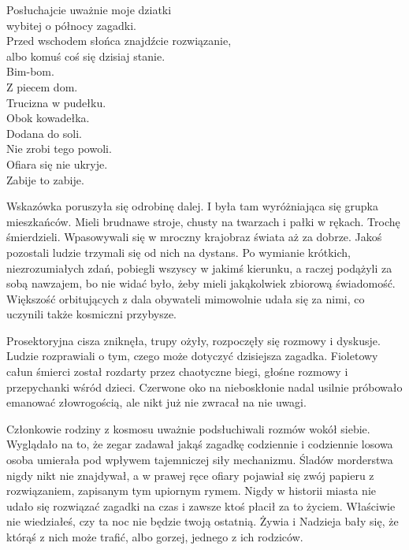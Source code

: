 \begin{poem}
	Posłuchajcie uważnie moje dziatki \\
	wybitej o północy zagadki. \\
	Przed wschodem słońca znajdźcie rozwiązanie, \\
	albo komuś coś się dzisiaj stanie. \\
	Bim-bom. \\
	Z piecem dom. \\
	Trucizna w pudełku. \\
	Obok kowadełka. \\
	Dodana do soli. \\
	Nie zrobi tego powoli. \\
	Ofiara się nie ukryje. \\
	Zabije to zabije. \\
\end{poem}

Wskazówka poruszyła się odrobinę dalej.
I była tam wyróżniająca się grupka mieszkańców.
Mieli brudnawe stroje, chusty na twarzach i pałki w rękach. Trochę śmierdzieli.
Wpasowywali się w mroczny krajobraz świata aż za dobrze.
Jakoś pozostali ludzie trzymali się od nich na dystans.
Po wymianie krótkich, niezrozumiałych zdań, pobiegli wszyscy w jakimś kierunku, a raczej podążyli za sobą nawzajem, bo nie widać było, żeby mieli jakąkolwiek zbiorową świadomość.
Większość orbitujących z dala obywateli mimowolnie udała się za nimi, co uczynili także kosmiczni przybysze.

Prosektoryjna cisza zniknęła, trupy ożyły, rozpoczęły się rozmowy i dyskusje.
Ludzie rozprawiali o tym, czego może dotyczyć dzisiejsza zagadka.
Fioletowy całun śmierci został rozdarty przez chaotyczne biegi, głośne rozmowy i przepychanki wśród dzieci.
Czerwone oko na nieboskłonie nadal usilnie próbowało emanować złowrogością, ale nikt już nie zwracał na nie uwagi.

Członkowie rodziny z kosmosu uważnie podsłuchiwali rozmów wokół siebie.
Wyglądało na to, że zegar zadawał jakąś zagadkę codziennie i codziennie losowa osoba umierała pod wpływem tajemniczej siły mechanizmu.
Śladów morderstwa nigdy nikt nie znajdywał, a w prawej ręce ofiary pojawiał się zwój papieru z rozwiązaniem, zapisanym tym upiornym rymem.
Nigdy w historii miasta nie udało się rozwiązać zagadki na czas i zawsze ktoś płacił za to życiem.
Właściwie nie wiedziałeś, czy ta noc nie będzie twoją ostatnią. 
Żywia i Nadzieja bały się, że którąś z nich może trafić, albo gorzej, jednego z ich rodziców.

